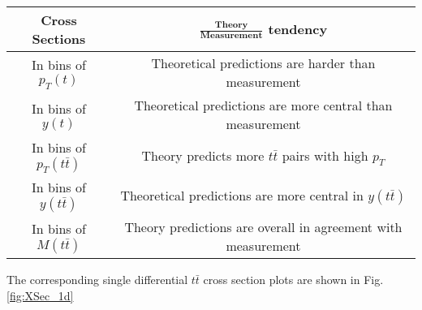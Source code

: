 \begin{center}
 \begin{tabular}{| c | c |}
  \hline
  \textbf{Cross Sections} 		& \textbf{$\frac{\mathbf{\text{Theory}}}{\mathbf{\text{Measurement}}}$ tendency} \\ \hline\hline
  
  In bins of $p_{T}(t)$			& Theoretical predictions are harder than measurement \\ \hline 
  In bins of $y(t)$			& Theoretical predictions are more central than measurement \\ \hline 
  In bins of $p_{T}(t\bar{t})$		& Theory predicts more $t\bar{t}$ pairs with high $p_{T}$ \\ \hline 
  In bins of $y(t\bar{t})$		& Theoretical predictions are more central in $y(t\bar{t})$ \\ \hline
  In bins of $M(t\bar{t})$		& Theory predictions are overall in agreement with measurement \\ \hline
 \end{tabular}
\end{center}

The corresponding single differential $t\bar{t}$ cross section plots are shown in Fig. \ref{fig:XSec_1d}

